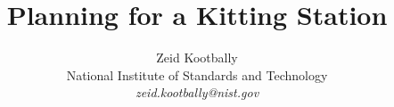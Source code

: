 \title{Planning for a Kitting Station}
\author{Zeid Kootbally\\ National Institute of Standards and Technology\\
        \emph{zeid.kootbally{@}nist.gov}} 
\date{}